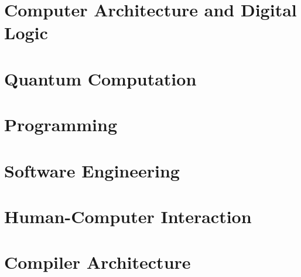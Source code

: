 \documentclass[11pt,twoside=semi,openright,numbers=noenddot,titlepage=false]{scrbook}
\begin{document}
\part{Computer Architecture and Digital Logic}\label{part:architecture}
\parttoc{}
% 
% 
% 
% 
% 


\part{Quantum Computation}\label{part:quantum}
\parttoc{}
% 
% 
% 
% 
% 


\part{Programming}\label{part:programming}
\parttoc{}
% 
% 
% 
% 
% 
% 


\part{Software Engineering}\label{part:engineering}
\parttoc{}
% 
% 
% 
% 
% 
% 
% 


\part{Human-Computer Interaction}\label{part:hci}
\parttoc{}
% 
% 
% 


\part{Compiler Architecture}\label{part:compilers}
\parttoc{}
% 
% 
% 
% 
% 
% 
% 
\end{document}
